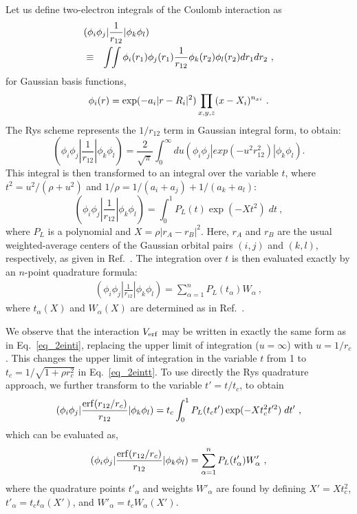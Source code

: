 Let us define two-electron integrals of the Coulomb interaction as 
\begin{eqnarray*}
\lefteqn{(\phi_i \phi_j |\frac{1}{r_{12}}| \phi_k \phi_l)} \nonumber \\
& \equiv & 
\int \!\! \int \phi_i (r_1) \phi_j (r_1) \frac{1}{r_{12}} \phi_k (r_2) \phi_l (r_2) dr_1 dr_2 ~,
\end{eqnarray*}
for Gaussian basis functions, 
$$\phi_i(r) = {\rm exp}(-a_i |r-R_i|^2) \prod_{x,y,z}(x-X_i)^{n_{xi}}~.$$ 
The Rys scheme represents the $1/r_{12}$ term in Gaussian integral form, 
to obtain: 
\begin{equation}
(\phi_i\phi_j| \frac{1}{r_{12}} |\phi_k\phi_l) = 
\frac{2}{\sqrt \pi} \int_0^\infty du 
(\phi_i\phi_j| exp(-u^2 r_{12}^2) |\phi_k\phi_l) .
\label{eq_2einti}
\end{equation}
This integral is then transformed to an integral over the variable 
$t$, where $t^2 = u^2/(\rho+u^2)$ and 
$1/\rho = 1/(a_i + a_j) + 1/(a_k + a_l)$:
\begin{equation}
(\phi_i\phi_j| \frac{1}{r_{12}} |\phi_k\phi_l) = 
 \int_0^1  P_L(t) \exp(-Xt^2) \; dt ~,
\label{eq_2eintt}
\end{equation}
where $P_L$ is a polynomial and $X = \rho|r_A - r_B|^2$.
Here, $r_A$ and $r_B$ are the usual weighted-average centers
of the Gaussian orbital pairs $(i,j)$ and $(k,l)$, respectively,
as given in Ref.~\cite{drk}.
The integration over $t$ is then evaluated exactly by an 
$n$-point quadrature formula:
\begin{eqnarray*}
(\phi_i\phi_j| \frac{1}{r_{12}} |\phi_k\phi_l) = 
 \sum_{\alpha=1}^n  P_L(t_\alpha) W_\alpha  ~,
\end{eqnarray*}
where $t_\alpha(X)$ and $W_\alpha(X)$ are determined as in
Ref.~\cite{drk}.

We observe that the interaction $V_{\rm erf}$ may be written in 
exactly the same form as in Eq.~\ref{eq_2einti}, replacing the upper 
limit of integration ($u=\infty$) with $u=1/r_c$.
This changes the upper limit of integration in the variable $t$ 
from 1 to $t_c = 1/\sqrt{1+\rho r_c^2}$ in Eq.~\ref{eq_2eintt}.
To use directly the Rys quadrature approach, we further transform to 
the variable $t' = t/t_c$, to obtain
\begin{eqnarray*}
(\phi_i\phi_j| \frac{{\rm erf}(r_{12}/r_c)}{r_{12}} |\phi_k\phi_l) = 
 t_c \int_0^1  P_L(t_ct') \exp(-Xt_c^2t'^2) \; dt' ~,
\end{eqnarray*}
which can be evaluated as,
\begin{eqnarray*}
(\phi_i\phi_j| \frac{{\rm erf}(r_{12}/r_c)}{r_{12}} |\phi_k\phi_l) = 
 \sum_{\alpha=1}^n  P_L(t'_\alpha) W'_\alpha ~,
\end{eqnarray*}
where the quadrature points $t'_\alpha$ and weights $W'_\alpha$
are found by defining $X' = Xt_c^2$, $t'_\alpha = t_c t_\alpha(X')$,
and $W'_\alpha = t_c W_\alpha(X')$.


